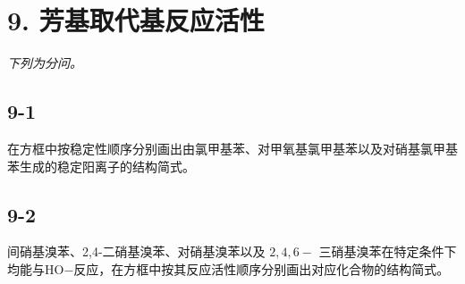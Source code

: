 \section*{9. 芳基取代基反应活性}
\textit{下列为分问。}

\subsection*{9-1}
在⽅框中按稳定性顺序分别画出由氯甲基苯、对甲氧基氯甲基苯以及对硝基氯甲基苯⽣成的稳定阳离⼦的结构简式。

\subsection*{9-2}
间硝基溴苯、2,4-⼆硝基溴苯、对硝基溴苯以及 $2 , 4 , 6 -$ 三硝基溴苯在特定条件下均能与HO−反应，在⽅框中按其反应活性顺序分别画出对应化合物的结构简式。
